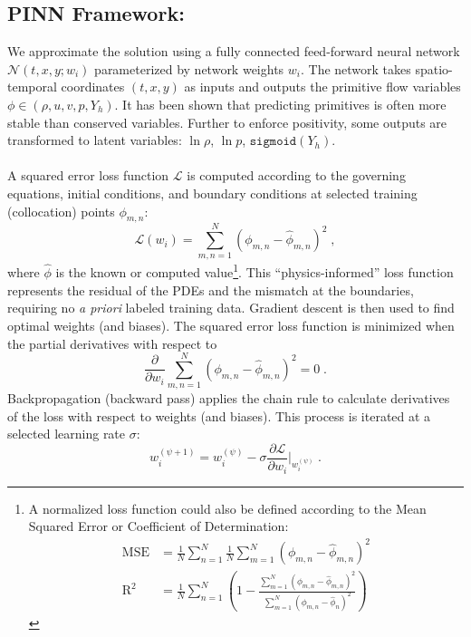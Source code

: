 \documentclass{homework}
\begin{document}
\subsection*{PINN Framework: \qquad}
We approximate the solution using a fully connected feed-forward neural network $\mathcal{N}(t, x, y; w_i)$ parameterized by network weights $w_i$. The network takes spatio-temporal coordinates $(t, x, y)$ as inputs and outputs the primitive flow variables $\phi \in (\rho, u, v, p, Y_h)$. It has been shown \cite{Yadav2025} that predicting primitives is often more stable than conserved variables. Further to enforce positivity, some outputs are transformed to latent variables: $\ln \rho$, $\ln p$, $\texttt{sigmoid}(Y_h)$.
\\ \\
A squared error loss function $\mathcal{L}$ is computed according to the governing equations, initial conditions, and boundary conditions at selected training (collocation) points $\phi_{m,n}$:
$$\mathcal{L}\left(w_i\right)=\sum_{m,n=1}^{N}\left(\phi_{m,n}-{\hat{\phi}}_{m,n}\right)^2 \; ,$$
where $\hat{\phi}$ is the known or computed value\footnote{A normalized loss function could also be defined according to the Mean Squared Error or Coefficient of Determination:
\begin{align*}
    \mathrm{MSE} &= \frac{1}{N}\sum_{n=1}^{N}{\frac{1}{N}\sum_{m=1}^{N}\left(\phi_{m,n}-{\hat{\phi}}_{m,n}\right)^2} \\
    \mathrm{R}^2 &= \frac{1}{N}\sum_{n=1}^{N}{ \left(1-\frac{\sum_{m=1}^{N}\left(\phi_{m,n} - {\hat{\phi}}_{m,n}\right)^2}{\sum_{m=1}^{N} \left(\phi_{m,n} - {\hat{\phi}}_n\right)^2} \right)}
\end{align*}}. This ``physics-informed'' loss function represents the residual of the PDEs and the mismatch at the boundaries, requiring no \emph{a priori} labeled training data. Gradient descent is then used to find optimal weights (and biases). The squared error loss function is minimized when the partial derivatives with respect to 
$$\frac{\partial}{\partial w_i}\sum_{m,n=1}^{N}\left(\phi_{m,n}-{\hat{\phi}}_{m,n}\right)^2 = 0 \; .$$
Backpropagation (backward pass) applies the chain rule to calculate derivatives of the loss with respect to weights (and biases). This process is iterated at a selected learning rate $\sigma$:
$$w_i^{(\psi+1)}=w_i^{(\psi)}-\sigma\frac{\partial\mathcal{L}}{\partial w_i}|_{w_i^{\left(\psi\right)}} \; .$$
\end{document}
